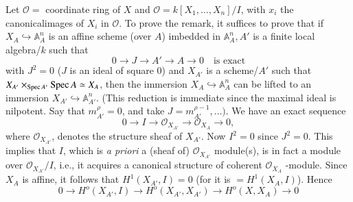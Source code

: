 Let $\mathscr{O}=$ coordinate ring of $X$ and
$\mathscr{O}=k[X_{1},\ldots,X_{n}]/I$, with $x_{i}$ the
canonical\pageoriginale  images of $X_{i}$ in $\mathscr{O}$. To prove
the remark, it suffices to prove that if
$X_{A}\hookrightarrow\mathbb{A}_{A}^{n}$ is an affine scheme (over
$A$) imbedded in $\mathbb{A}_{A}^{n}, A'$ is a finite local
algebra/$k$ such that 
\begin{equation*}
0\rightarrow J \rightarrow A' \rightarrow A \rightarrow 0\quad \text{is exact}
\end{equation*}
with $J^{2}=0$ ($J$ is an ideal of square $0$) and $X_{A'}$ is a scheme/$A'$ such that $X_{A'}\times_{\operatorname{Spec} A'} \operatorname{Spec} A \simeq X_{A}$, then the immersion $X_{A}\hookrightarrow \mathbb{A}_{A}^{n}$ can be lifted to an immersion $X_{A'}\hookrightarrow\mathbb{A}_{A'}^{n}$. (This reduction is immediate since the maximal ideal is nilpotent. Say that $m_{A'}^{\rho}=0$, and take $J=m_{A'}^{\rho-1},\ldots)$. We have an exact sequence
\begin{equation*}
0\to I \to \mathscr{O}_{X_{A'}} \to \mathscr{O}_{X_{A}}\to 0,
\end{equation*}
where $\mathscr{O}_{X_{A'}}$, denotes the structure sheaf of $X_{A'}$. Now $I^{2}=0$ since $J^{2}=0$. This implies that $I$, which is {\em a priori} a (sheaf of) $\mathscr{O}_{X_{A'}}$ module(s), is in fact a module over $\mathscr{O}_{X_{A'}}/I$, i.e., it acquires a canonical structure  of coherent $\mathscr{O}_{X_{A}}$ -module. Since $X_{A}$ is affine, it follows that $H^{1}(X_{A'}, I)=0$ (for it is $=H^{1}(X_{A}, I)$). Hence
\begin{equation*}
  0\to H^{o}(X_{A'}, I)\to H^{o}(X_{A'}, X_{A'})\to H^{o}(X, X_{A})\to 0
\end{equation*}
